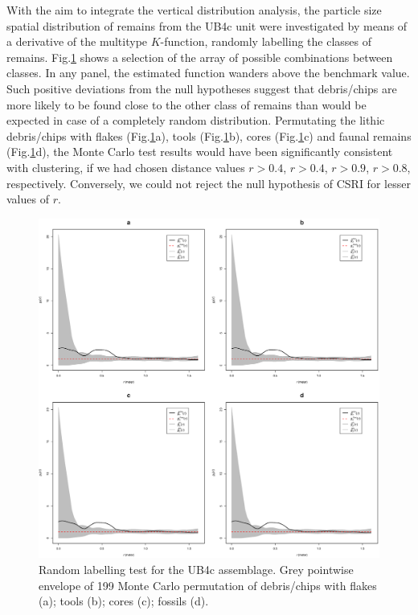 \documentclass[preprint,authoryear,times]{elsarticle} %
\begin{document}
With the aim to integrate the vertical distribution analysis, the particle size spatial distribution of remains from the UB4c unit were investigated by means of a derivative of the multitype $K$-function, randomly labelling the classes of remains. Fig.\ref{fig:13} shows a selection of the array of possible combinations between classes. In any panel, the estimated function wanders above the benchmark value. Such positive deviations from the null hypotheses suggest that debris/chips are more likely to be found close to the other class of remains than would be expected in case of a completely random distribution. Permutating the lithic debris/chips with flakes (Fig.\ref{fig:13}a), tools (Fig.\ref{fig:13}b), cores (Fig.\ref{fig:13}c) and faunal remains (Fig.\ref{fig:13}d), the Monte Carlo test results would have been significantly consistent with clustering, if we had chosen distance values $r > 0.4$, $r > 0.4$, $r > 0.9$, $r > 0.8$, respectively. Conversely, we could not reject the null hypothesis of CSRI for lesser values of $r$.

\begin{figure}[]
  \centering
  \includegraphics[width=1\textwidth]{../artwork/Fig13.eps}
  \caption{Random labelling test for the UB4c assemblage. Grey pointwise envelope of 199 Monte Carlo permutation of debris/chips with flakes (a); tools (b); cores (c); fossils (d).}
  \label{fig:13}
\end{figure}
\end{document}
